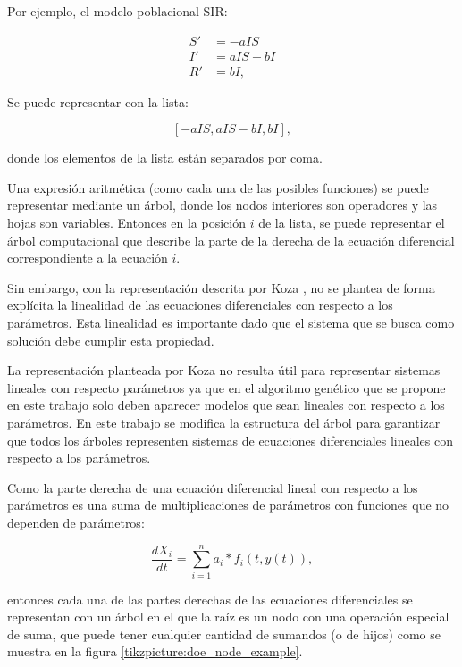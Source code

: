 Por ejemplo, el modelo poblacional SIR:

\begin{align*}
    S' & = - aIS    \\
    I' & = aIS - bI \\
    R' & = bI,
\end{align*}

Se puede representar con la lista:

$$[-aIS, aIS - bI, bI],$$

donde los elementos de la lista están separados por coma.

Una expresión aritmética (como cada una de las posibles funciones) se puede representar mediante un árbol, donde los nodos interiores son operadores y las hojas son variables. Entonces en la posición $i$ de la lista, se puede representar el árbol computacional que describe la parte de la derecha de la ecuación diferencial correspondiente a la ecuación $i$.

Sin embargo, con la representación descrita por Koza \cite{zelinka2005analytic}, no se plantea de forma explícita la linealidad de las ecuaciones diferenciales con respecto a los parámetros. Esta linealidad es importante dado que el sistema que se busca como solución debe cumplir esta propiedad.

La representación planteada por Koza no resulta útil para representar sistemas lineales con respecto parámetros ya que en el algoritmo genético que se propone en este trabajo solo deben aparecer modelos que sean lineales con respecto a los parámetros. En este trabajo se modifica la estructura del árbol para garantizar que todos los árboles representen sistemas de ecuaciones diferenciales lineales con respecto a los parámetros.

Como la parte derecha de una ecuación diferencial lineal con respecto a los parámetros es una suma de multiplicaciones de parámetros con funciones que no dependen de parámetros:

$$\frac{dX_i}{dt} = \sum_{i=1}^{n} a_i * f_i(t, y(t)),$$

entonces cada una de las partes derechas de las ecuaciones diferenciales se representan con un árbol en el que la raíz es un nodo con una operación especial de suma, que puede tener cualquier cantidad de sumandos (o de hijos) como se muestra en la figura \ref{tikzpicture:doe_node_example}.



